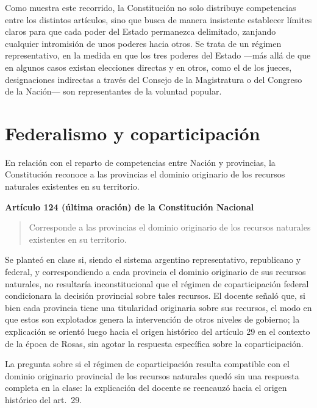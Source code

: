 \documentclass[12pt,oneside]{book}
\newenvironment{normacitada}[1]{%
    \medskip
    \noindent\textbf{#1}\par\smallskip
    \begin{quote}\itshape
}{%
    \end{quote}
    \medskip
}
\begin{document}
Como muestra este recorrido, la Constitución no solo distribuye competencias entre los distintos artículos, sino que busca de manera insistente establecer límites claros para que cada poder del Estado permanezca delimitado, zanjando cualquier intromisión de unos poderes hacia otros. Se trata de un régimen representativo, en la medida en que los tres poderes del Estado —más allá de que en algunos casos existan elecciones directas y en otros, como el de los jueces, designaciones indirectas a través del Consejo de la Magistratura o del Congreso de la Nación— son representantes de la voluntad popular.

\section{Federalismo y coparticipación}

En relación con el reparto de competencias entre Nación y provincias, la Constitución reconoce a las provincias el dominio originario de los recursos naturales existentes en su territorio.

\begin{normacitada}{Artículo 124 (última oración) de la Constitución Nacional}
Corresponde a las provincias el dominio originario de los recursos naturales existentes en su territorio.
\end{normacitada}

Se planteó en clase si, siendo el sistema argentino representativo, republicano y federal, y correspondiendo a cada provincia el dominio originario de sus recursos naturales, no resultaría inconstitucional que el régimen de coparticipación federal condicionara la decisión provincial sobre tales recursos. El docente señaló que, si bien cada provincia tiene una titularidad originaria sobre sus recursos, el modo en que estos son explotados genera la intervención de otros niveles de gobierno; la explicación se orientó luego hacia el origen histórico del artículo 29 en el contexto de la época de Rosas, sin agotar la respuesta específica sobre la coparticipación.

\begin{note}
La pregunta sobre si el régimen de coparticipación resulta compatible con el dominio originario provincial de los recursos naturales quedó sin una respuesta completa en la clase: la explicación del docente se reencauzó hacia el origen histórico del art.\ 29.
\end{note}
\end{document}
